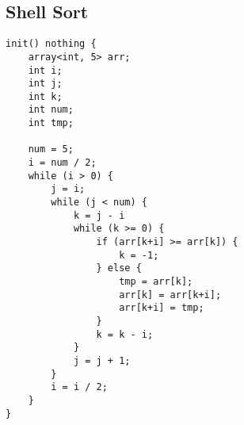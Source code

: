 \documentclass[a4paper,11pt]{article}
\begin{document}
\subsection{Shell Sort}
\begin{lstlisting}
init() nothing {
    array<int, 5> arr;
    int i;
    int j;
    int k;
    int num;
    int tmp;
    
    num = 5;
    i = num / 2;
    while (i > 0) {
        j = i;
        while (j < num) {
            k = j - i
            while (k >= 0) {
                if (arr[k+i] >= arr[k]) {
                    k = -1;
                } else {
                    tmp = arr[k];
                    arr[k] = arr[k+i];
                    arr[k+i] = tmp;
                }
                k = k - i;
            }
            j = j + 1;
        }
        i = i / 2;
    }
}
\end{lstlisting}
\end{document}
